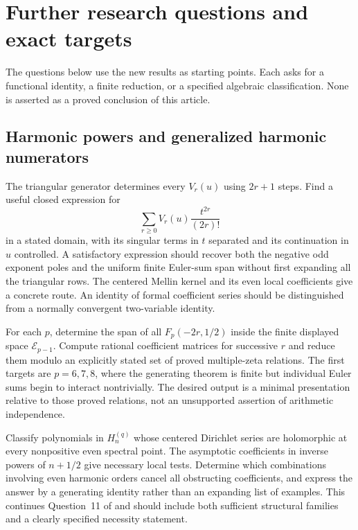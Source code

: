 \section{Further research questions and exact targets}
\label{sec:research}

The questions below use the new results as starting points. Each asks
for a functional identity, a finite reduction, or a specified algebraic
classification. None is asserted as a proved conclusion of this article.

\subsection{Harmonic powers and generalized harmonic numerators}

\begin{question}
The triangular generator determines every $V_r(u)$ using $2r+1$
steps. Find a useful closed expression for
\[
 \sum_{r\ge0}V_r(u)\frac{t^{2r}}{(2r)!}
\]
in a stated domain, with its singular terms in $t$ separated and its
continuation in $u$ controlled. A satisfactory expression should
recover both the negative odd exponent poles and the uniform finite
Euler-sum span without first expanding all the triangular rows.
The centered Mellin kernel and its even local coefficients give a
concrete route. An identity of formal coefficient series should be
distinguished from a normally convergent two-variable identity.
\end{question}

\begin{question}
For each $p$, determine the span of all $F_p(-2r,1/2)$ inside the
finite displayed space $\mathcal E_{p-1}$. Compute rational
coefficient matrices for successive $r$ and reduce them modulo an
explicitly stated set of proved multiple-zeta relations. The first
targets are $p=6,7,8$, where the generating theorem is finite but
individual Euler sums begin to interact nontrivially. The desired
output is a minimal presentation relative to those proved relations,
not an unsupported assertion of arithmetic independence.
\end{question}

\begin{question}
Classify polynomials in $H_n^{(q)}$ whose centered Dirichlet series
are holomorphic at every nonpositive even spectral point. The
asymptotic coefficients in inverse powers of $n+1/2$ give necessary
local tests. Determine which combinations involving even harmonic
orders cancel all obstructing coefficients, and express the answer
by a generating identity rather than an expanding list of examples.
This continues Question~11 of \cite{RepoExactResonant} and should
include both sufficient structural families and a clearly specified
necessity statement.
\end{question}

